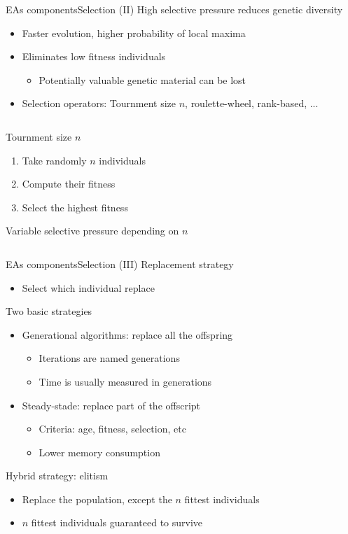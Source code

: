 \documentclass[10pt,compress]{beamer} %
\begin{document}
\begin{frame}{EAs components}{Selection (II)} 
	High selective pressure reduces \alert{genetic diversity}
	\begin{itemize}
		\item Faster evolution, higher probability of local maxima
		\item Eliminates low fitness individuals
		\begin{itemize}
			\item Potentially valuable genetic material can be lost
		\end{itemize}
		\item Selection operators: Tournment size $n$, roulette-wheel, rank-based, ...
	\end{itemize}
	
    \begin{columns}
	\begin{block}{Tournment size $n$}
	\begin{enumerate}
		\item Take randomly $n$ individuals
		\item Compute their fitness
		\item Select the highest fitness
	\end{enumerate}
	Variable selective pressure depending on $n$
    \end{block}
    \end{columns}
\end{frame}

\begin{frame}{EAs components}{Selection (III)} 
	Replacement strategy
	\begin{itemize}
		\item Select which individual replace
	\end{itemize}
	
	Two basic strategies
	\begin{itemize}
		\item Generational algorithms: replace all the offspring
		\begin{itemize}
			\item Iterations are named \alert{generations}
			\item Time is usually measured in generations
		\end{itemize}
		\item Steady-stade: replace part of the offscript
		\begin{itemize}
			\item Criteria: age, fitness, selection, etc
			\item Lower memory consumption
		\end{itemize}
	\end{itemize}
	Hybrid strategy: \alert{elitism}
		\begin{itemize}
			\item Replace the population, except the $n$ fittest individuals
			\item $n$ fittest individuals guaranteed to survive
		\end{itemize}
\end{frame}
\end{document}
